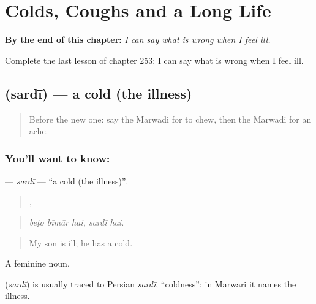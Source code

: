 
\chapter{Colds, Coughs and a Long Life}
\label{ch:mw-colds-coughs-and-a-long-life}

\begin{chapteropening}
\textbf{By the end of this chapter:} \emph{I can say what is wrong when I feel ill.}

Complete the last lesson of chapter 253: I can say what is wrong when I feel ill.
\end{chapteropening}

\section[\texorpdfstring{\mw{सरदी} (sardī)}{सरदी (sardī)}]{ (sardī) — a cold (the illness)}

\label{lesson:MW-C253-sardi}



\begin{quote}
Before the new one: say the Marwadi for to chew, then the Marwadi for an ache.
\end{quote}

\subsection*{You'll want to know: }
\textbf{} — \emph{sardī} — \textquotedblleft{}a cold (the illness)\textquotedblright{}.

\begin{quote}
  ,  
\end{quote}

\begin{quote}
\emph{beṭo bīmār hai, sardī hai.}
\end{quote}

\begin{quote}
My son is ill; he has a cold.
\end{quote}

A feminine noun.

\begin{cousinweb}
\textbf{} (\emph{sardī}) is usually traced to Persian \emph{sardī}, \textquotedblleft{}coldness\textquotedblright{}; in Marwari it names the illness.
\end{cousinweb}

